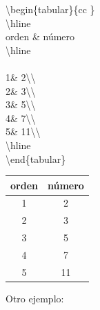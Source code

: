 \documentclass{article}
\begin{document}
\bigskip
\begin{multicols}{2}
\noindent
\textbackslash begin\{tabular\}\{\textbar \hspace*{1mm}c\hspace{1mm}\textbar\hspace{1mm}c\hspace*{1mm} \textbar\}\\
\textbackslash hline\\
orden \& n\'umero\\
\textbackslash hline\\
\\
1\quad \& 2\textbackslash \textbackslash \\
2\quad \& 3\textbackslash \textbackslash \\
3\quad \& 5\textbackslash \textbackslash \\
4\quad \& 7\textbackslash \textbackslash \\
5\quad \& 11\textbackslash \textbackslash \\
\textbackslash hline\\
\textbackslash end\{tabular\}\\
\columnbreak
\begin{tabular}{|c | c|}
\hline
orden & n\'umero\\
\hline
1	&2\\
2	&3\\
3	&5\\
4	&7\\
5	&11\\
\hline 
\end{tabular}
\end{multicols}

Otro ejemplo:
\end{document}
